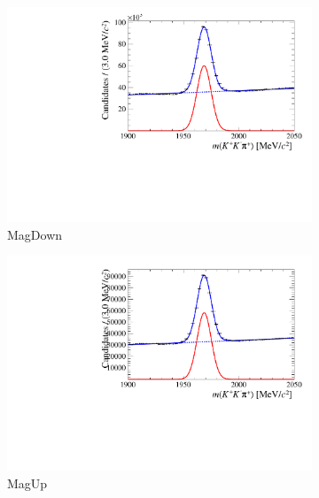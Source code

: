 \begin{figure}[!h]
\begin{subfigure}[t]{0.4\textwidth}
      \centering
      \includegraphics[width=1.0\textwidth]{figs/Selection/Fit_Data_Bs02DsPi_Ds2KKPi_2016_MagDown_PreSel.pdf}
      \caption{\decay{\Dsp}{\Kp\Km\pip} MagDown}
   \end{subfigure}
   \begin{subfigure}[t]{0.4\textwidth}
      \centering
      \includegraphics[width=1.0\textwidth]{figs/Selection/Fit_Data_Bs02DsPi_Ds2KKPi_2016_MagUp_PreSel.pdf}
      \caption{\decay{\Dsp}{\Kp\Km\pip} MagUp}
   \end{subfigure}
   \begin{subfigure}[t]{0.4\textwidth}
      \centering

\end{subfigure}
\end{figure}
